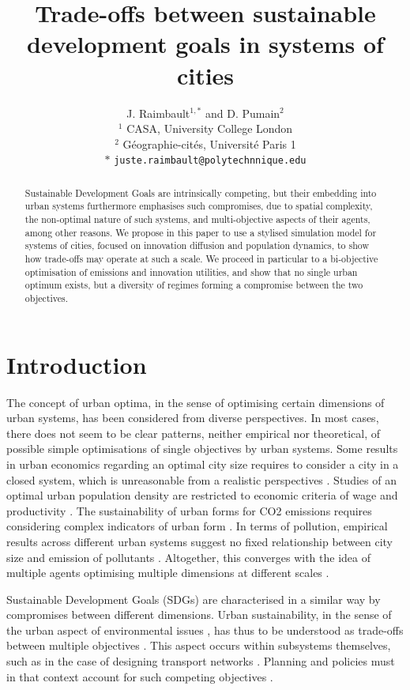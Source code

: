 \documentclass{article}
\title{Trade-offs between sustainable development goals in systems of cities}
\author{J. Raimbault$^{1,\ast}$ and D. Pumain$^{2}$\medskip\\
$^{1}$ CASA, University College London\\
$^{2}$ G{\'e}ographie-cit{\'e}s, Universit{\'e} Paris 1\medskip\\
$\ast$ \texttt{juste.raimbault@polytechnnique.edu}
}
\date{}
\begin{document}
\maketitle

\begin{abstract}
	Sustainable Development Goals are intrinsically competing, but their embedding into urban systems furthermore emphasises such compromises, due to spatial complexity, the non-optimal nature of such systems, and multi-objective aspects of their agents, among other reasons. We propose in this paper to use a stylised simulation model for systems of cities, focused on innovation diffusion and population dynamics, to show how trade-offs may operate at such a scale. We proceed in particular to a bi-objective optimisation of emissions and innovation utilities, and show that no single urban optimum exists, but a diversity of regimes forming a compromise between the two objectives.
\end{abstract}


\section{Introduction}

The concept of urban optima, in the sense of optimising certain dimensions of urban systems, has been considered from diverse perspectives. In most cases, there does not seem to be clear patterns, neither empirical nor theoretical, of possible simple optimisations of single objectives by urban systems. Some results in urban economics regarding an optimal city size requires to consider a city in a closed system, which is unreasonable from a realistic perspectives \cite{singell1974optimum}. Studies of an optimal urban population density are restricted to economic criteria of wage and productivity \cite{su2017density}. The sustainability of urban forms for CO2 emissions requires considering complex indicators of urban form \cite{le2012urban}. In terms of pollution, empirical results across different urban systems suggest no fixed relationship between city size and emission of pollutants \cite{han2016optimum}. Altogether, this converges with the idea of multiple agents optimising multiple dimensions at different scales \cite{pumain2008socio}.

Sustainable Development Goals (SDGs) are characterised in a similar way by compromises between different dimensions. Urban sustainability, in the sense of the urban aspect of environmental issues \cite{finco2001pathways}, has thus to be understood as trade-offs between multiple objectives \cite{viguie2012trade}. This aspect occurs within subsystems themselves, such as in the case of designing transport networks \cite{sharma2011multiobjective}. Planning and policies must in that context account for such competing objectives \cite{caparros2015optimised}.
\end{document}
